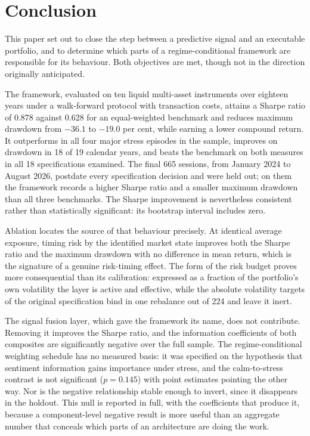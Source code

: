 \documentclass{singlecol-new}
\theoremstyle{TH}{
\newtheorem{lemma}{Lemma}
\newtheorem{theorem}[lemma]{Theorem}
\newtheorem{corrolary}[lemma]{Corrolary}
\newtheorem{conjecture}[lemma]{Conjecture}
\newtheorem{proposition}[lemma]{Proposition}
\newtheorem{claim}[lemma]{Claim}
\newtheorem{stheorem}[lemma]{Wrong Theorem}
\newtheorem{algorithm}{Algorithm}
}
\theoremstyle{THrm}{
\newtheorem{definition}{Definition}[section]
\newtheorem{question}{Question}[section]
\newtheorem{remark}{Remark}
\newtheorem{scheme}{Scheme}
}
\theoremstyle{THhit}{
\newtheorem{case}{Case}[section]
}
\begin{document}
\section{Conclusion}
\label{sec:conclusion}

This paper set out to close the step between a predictive signal and an executable
portfolio, and to determine which parts of a regime-conditional framework are
responsible for its behaviour. Both objectives are met, though not in the direction
originally anticipated.

The framework, evaluated on ten liquid multi-asset instruments over eighteen years under
a walk-forward protocol with transaction costs, attains a Sharpe ratio of 0.878 against
0.628 for an equal-weighted benchmark and reduces maximum drawdown from $-36.1$ to
$-19.0$ per cent, while earning a lower compound return. It outperforms in all four
major stress episodes in the sample, improves on drawdown in 18 of 19 calendar years,
and beats the benchmark on both measures in all 18 specifications examined. The final
665 sessions, from January 2024 to August 2026, postdate every specification decision
and were held out; on them the framework records a higher Sharpe ratio and a smaller
maximum drawdown than all three benchmarks. The Sharpe improvement is nevertheless
consistent rather than statistically significant: its bootstrap interval includes
zero.

Ablation locates the source of that behaviour precisely. At identical average exposure,
timing risk by the identified market state improves both the Sharpe ratio and the
maximum drawdown with no difference in mean return, which is the signature of a genuine
risk-timing effect. The form of the risk budget proves more consequential than its
calibration: expressed as a fraction of the portfolio's own volatility the layer is
active and effective, while the absolute volatility targets of the original
specification bind in one rebalance out of 224 and leave it inert.

The signal fusion layer, which gave the framework its name, does not contribute.
Removing it improves the Sharpe ratio, and the information coefficients of both
composites are significantly negative over the full sample. The regime-conditional
weighting schedule has no measured basis: it was specified on the hypothesis that
sentiment information gains importance under stress, and the calm-to-stress contrast
is not significant ($p = 0.145$) with point estimates pointing the other way. Nor is the
negative relationship stable enough to invert, since it disappears in the holdout. This
null is reported in full,
with the coefficients that produce it, because a component-level negative result is more
useful than an aggregate number that conceals which parts of an architecture are doing
the work.
\end{document}
